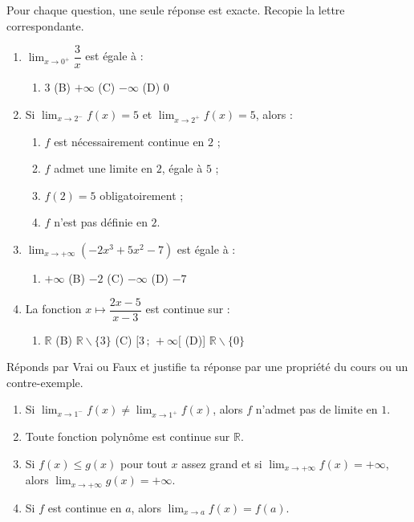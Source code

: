 \documentclass[11pt]{article}
\def\setminus{\mathbin{\backslash}}\let\smallsetminus\setminus
\begin{document}
\begin{exercice}
Pour chaque question, une seule réponse est exacte. Recopie la lettre correspondante.
\begin{enumerate}
\item $\displaystyle\lim_{x\to 0^+}\dfrac{3}{x}$ est égale à :
\begin{enumerate}
\item[(A)] $3$ \qquad (B) $+\infty$ \qquad (C) $-\infty$ \qquad (D) $0$
\end{enumerate}
\item Si $\displaystyle\lim_{x\to 2^-}f(x)=5$ et $\displaystyle\lim_{x\to 2^+}f(x)=5$, alors :
\begin{enumerate}
\item[(A)] $f$ est nécessairement continue en $2$ ;
\item[(B)] $f$ admet une limite en $2$, égale à $5$ ;
\item[(C)] $f(2)=5$ obligatoirement ;
\item[(D)] $f$ n'est pas définie en $2$.
\end{enumerate}
\item $\displaystyle\lim_{x\to+\infty}\left(-2x^3+5x^2-7\right)$ est égale à :
\begin{enumerate}
\item[(A)] $+\infty$ \qquad (B) $-2$ \qquad (C) $-\infty$ \qquad (D) $-7$
\end{enumerate}
\item La fonction $x\mapsto\dfrac{2x-5}{x-3}$ est continue sur :
\begin{enumerate}
\item[(A)] $\mathbb{R}$ \qquad (B) $\mathbb{R}\setminus\{3\}$ \qquad (C) $[3\,;\,+\infty[$ \qquad (D)] $\mathbb{R}\setminus\{0\}$
\end{enumerate}
\end{enumerate}
\end{exercice}

\begin{exercice}
Réponds par Vrai ou Faux et justifie ta réponse par une propriété du cours ou un contre-exemple.
\begin{enumerate}
\item Si $\displaystyle\lim_{x\to 1^-}f(x)\neq\lim_{x\to 1^+}f(x)$, alors $f$ n'admet pas de limite en $1$.
\item Toute fonction polynôme est continue sur $\mathbb{R}$.
\item Si $f(x)\leq g(x)$ pour tout $x$ assez grand et si $\displaystyle\lim_{x\to+\infty}f(x)=+\infty$, alors $\displaystyle\lim_{x\to+\infty}g(x)=+\infty$.
\item Si $f$ est continue en $a$, alors $\displaystyle\lim_{x\to a}f(x)=f(a)$.
\end{enumerate}
\end{exercice}
\end{document}
